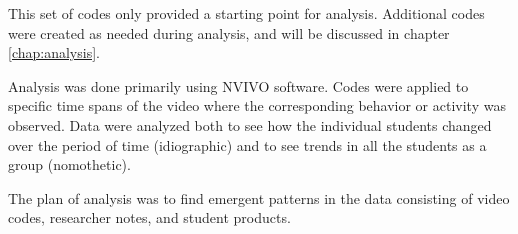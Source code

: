 This set of codes only provided a starting point for analysis. Additional codes were created as needed during analysis, and will be discussed in chapter \ref{chap:analysis}. 

Analysis was done primarily using NVIVO software. Codes were applied to specific time spans of the video where the corresponding behavior or activity was observed. Data
were analyzed both to see how the individual students changed over the period
of time (idiographic) and to see trends in all the students as a group
(nomothetic).

The plan of analysis was to find emergent patterns in the data consisting of video codes, researcher notes, and student products. 
